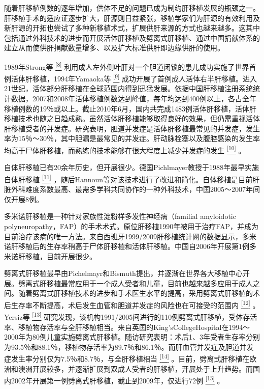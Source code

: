 随着肝移植例数的逐年增加，供体不足的问题已成为制约肝移植发展的瓶颈之一。肝移植手术的适应证逐步扩大，肝源则日益紧张，移植学家们为肝源的有效利用及新肝源的开拓也尝试了多种新移植术式，扩展供肝来源的方式也越来越多。这其中包括通过外科技术的进步而开展活体肝移植及劈离式肝移植、通过中国捐献体系的建立从而使供肝捐献数量增多、以及扩大标准供肝即边缘供肝的使用。

1989年Strong等
\protect\hyperlink{text00020.htmlux5cux23ch8-19}{\textsuperscript{{[}8{]}}}
利用成人左外侧叶肝对一个胆道闭锁的患儿成功实施了世界首例活体肝移植，1994年Yamaoka等
\protect\hyperlink{text00020.htmlux5cux23ch9-19}{\textsuperscript{{[}9{]}}}
成功开展了首例成人活体右半肝移植。进入21世纪，活体部分肝移植在全球范围内得到迅猛发展。依据中国肝移植注册系统统计数据，2007和2008年活体移植例数达到峰值，每年均达到400例以上，各占全年移植例数的19％或以上。截止2010年6月，国内共完成1483例活体肝移植，活体肝移植技术也随之日趋成熟。虽然活体肝移植能够取得良好的效果，但仍需重视活体肝移植受者的并发症。研究表明，胆道并发症是活体肝移植最常见的并发症，发生率为15％～30％，其中胆漏是最常见的并发症。肝动脉栓塞以及腹腔感染的发生率均高于尸体肝移植，而熟练的技术能够在很大程度上减少并发症的发生
\protect\hyperlink{text00020.htmlux5cux23ch10-19}{\textsuperscript{{[}10{]}}}
。

自体肝移植已有20余年历史，但开展很少。德国Pichlmayer教授于1988年最早实施自体肝移植
\protect\hyperlink{text00020.htmlux5cux23ch11-19}{\textsuperscript{{[}11{]}}}
，随后Hannoun等对该技术进行了改进和简化。自体移植是目前肝脏外科难度系数最高、最需多学科共同协作的一种外科技术，中国2005～2007年间仅开展8例。

多米诺肝移植是一种针对家族性淀粉样多发性神经病（familial amyloidotic
polyneuropathy，FAP）的手术术式。原位肝移植1990年被用于治疗FAP，并成为目前治疗该病的唯一方法。来自西班牙1999/2009肝移植统计网的数据显示，多米诺肝移植后的生存率稍高于尸体肝移植和活体肝移植。中国自2006年开展第1例多米诺肝移植，目前开展很少。

劈离式肝移植最早由Pichelmayr和Bismuth提出，并逐渐在世界各大移植中心开展。劈离式肝移植最常应用于一个成人受者和儿童，目前也越来越多应用于成人之间。随着劈离式肝移植技术的进步和手术医生水平的提高，采用劈离式肝移植的术后生存率不断提高，术后发生血管和胆道并发症的风险也在可接受的范围内
\protect\hyperlink{text00020.htmlux5cux23ch12-19}{\textsuperscript{{[}12{]}}}
。Yersiz等
\protect\hyperlink{text00020.htmlux5cux23ch13-19}{\textsuperscript{{[}13{]}}}
研究发现，该机构1991/2005间进行的110例劈离式肝移植，受体存活率、移植物存活率与全肝移植相当。来自英国的King'sCollegeHospital在1994～2000年为80例儿童实施劈离式肝移植。随访研究表明：术后1、3年受者生存率分别为93.5％和88.1％，移植物存活率为89.7％和86.1％。而肝血管并发症及胆道并发症发生率分别仅为7.5％和8.7％，与全肝移植相当
\protect\hyperlink{text00020.htmlux5cux23ch14-19}{\textsuperscript{{[}14{]}}}
。目前，劈离式肝移植在欧洲和澳洲开展较多，并逐渐扩展到双成人受者的肝移植，开展处于上升趋势。而国内2002年开展第一例劈离式肝移植，截止到2009年，仅进行72例
\protect\hyperlink{text00020.htmlux5cux23ch15-19}{\textsuperscript{{[}15{]}}}
。

